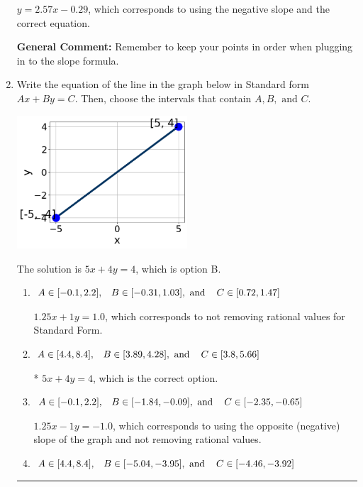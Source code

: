 \documentclass{extbook}[14pt]
\newcommand{\litem}[1]{\item #1

\rule{\textwidth}{0.4pt}}
\begin{document}
\begin{enumerate}
{\begin{enumerate}[label=\Alph*.]
 $y = 2.57x -0.29$, which corresponds to using the negative slope and the correct equation.
\end{enumerate}

\textbf{General Comment:} Remember to keep your points in order when plugging in to the slope formula.
}
\litem{
Write the equation of the line in the graph below in Standard form $Ax+By=C$. Then, choose the intervals that contain $A, B, \text{ and } C$.

\begin{center}
    \includegraphics[width=0.5\textwidth]{../Figures/linearGraphToStandardB.png}
\end{center}


The solution is \( 5x + 4y = 4 \), which is option B.\begin{enumerate}[label=\Alph*.]
\item \( A \in [-0.1, 2.2], \hspace{3mm} B \in [-0.31, 1.03], \text{ and } \hspace{3mm} C \in [0.72, 1.47] \)

 $1.25x + 1y = 1.0$, which corresponds to not removing rational values for Standard Form.
\item \( A \in [4.4, 8.4], \hspace{3mm} B \in [3.89, 4.28], \text{ and } \hspace{3mm} C \in [3.8, 5.66] \)

* $5x + 4y = 4$, which is the correct option.
\item \( A \in [-0.1, 2.2], \hspace{3mm} B \in [-1.84, -0.09], \text{ and } \hspace{3mm} C \in [-2.35, -0.65] \)

 $1.25x - 1y = -1.0$, which corresponds to using the opposite (negative) slope of the graph and not removing rational values.
\item \( A \in [4.4, 8.4], \hspace{3mm} B \in [-5.04, -3.95], \text{ and } \hspace{3mm} C \in [-4.46, -3.92] \)


\end{enumerate}}
\end{enumerate}
\end{document}
